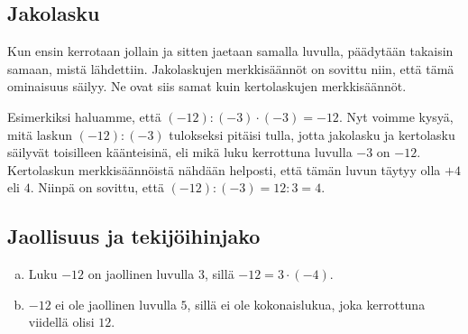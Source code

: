 \subsection*{Jakolasku}

        Kun ensin kerrotaan jollain ja sitten jaetaan samalla luvulla, päädytään takaisin samaan, mistä lähdettiin.  Jakolaskujen merkkisäännöt on sovittu niin, että tämä ominaisuus säilyy. Ne ovat siis samat kuin kertolaskujen merkkisäännöt.
    
    Esimerkiksi haluamme, että $(-12):(-3)\cdot (-3)=-12$. Nyt voimme kysyä, mitä laskun $(-12):(-3)$ tulokseksi pitäisi tulla, jotta jakolasku ja kertolasku säilyvät toisilleen käänteisinä, eli mikä luku kerrottuna luvulla $-3$ on $-12$. Kertolaskun merkkisäännöistä nähdään helposti, että tämän luvun täytyy olla $+4$ eli $4$. Niinpä on sovittu, että $(-12):(-3)=12:3=4$.



    \subsection*{Jaollisuus ja tekijöihinjako}

   
    
    \begin{esimerkki}
    \begin{enumerate}[a)]
    \item Luku $-12$ on jaollinen luvulla $3$, sillä $-12 = 3 \cdot (-4)$.
    \item $-12$ ei ole jaollinen luvulla $5$, sillä ei ole kokonaislukua, joka kerrottuna viidellä olisi $12$.
    \end{enumerate}
    \end{esimerkki}
    
